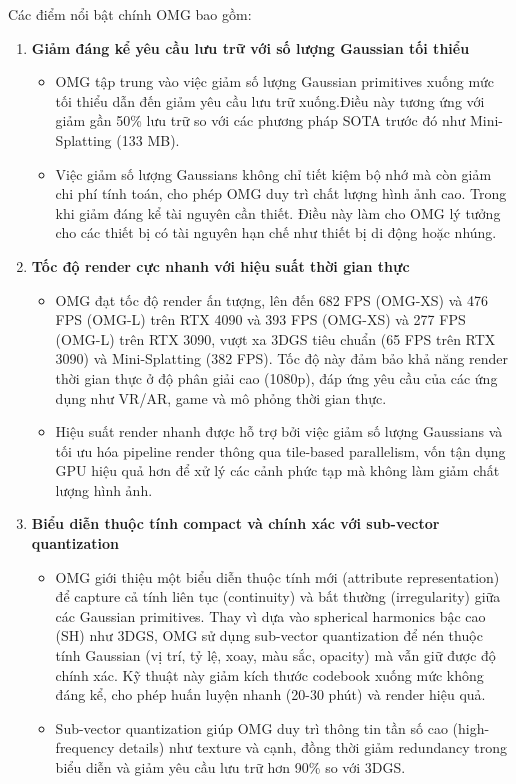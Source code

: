 Các điểm nổi bật chính OMG bao gồm:
\begin{enumerate}
    \item \textbf{Giảm đáng kể yêu cầu lưu trữ với số lượng Gaussian tối thiểu}
    \begin{itemize}
        \item OMG tập trung vào việc giảm số lượng Gaussian primitives xuống mức tối thiểu dẫn đến giảm yêu cầu lưu trữ xuống.Điều này tương ứng với giảm gần 50\% lưu trữ so với các phương pháp SOTA trước đó như Mini-Splatting (133 MB).
        \item Việc giảm số lượng Gaussians không chỉ tiết kiệm bộ nhớ mà còn giảm chi phí tính toán, cho phép OMG duy trì chất lượng hình ảnh cao. Trong khi giảm đáng kể tài nguyên cần thiết. Điều này làm cho OMG lý tưởng cho các thiết bị có tài nguyên hạn chế như thiết bị di động hoặc nhúng.
    \end{itemize}
    \item \textbf{Tốc độ render cực nhanh với hiệu suất thời gian thực}
    \begin{itemize}
        \item OMG đạt tốc độ render ấn tượng, lên đến 682 FPS (OMG-XS) và 476 FPS (OMG-L) trên RTX 4090 và 393 FPS (OMG-XS) và 277 FPS (OMG-L) trên RTX 3090, vượt xa 3DGS tiêu chuẩn (65 FPS trên RTX 3090) và Mini-Splatting (382 FPS). Tốc độ này đảm bảo khả năng render thời gian thực ở độ phân giải cao (1080p), đáp ứng yêu cầu của các ứng dụng như VR/AR, game và mô phỏng thời gian thực.
        \item Hiệu suất render nhanh được hỗ trợ bởi việc giảm số lượng Gaussians và tối ưu hóa pipeline render thông qua tile-based parallelism, vốn tận dụng GPU hiệu quả hơn để xử lý các cảnh phức tạp mà không làm giảm chất lượng hình ảnh.
    \end{itemize}
    \item \textbf{Biểu diễn thuộc tính compact và chính xác với sub-vector quantization}
    \begin{itemize}
        \item OMG giới thiệu một biểu diễn thuộc tính mới (attribute representation) để capture cả tính liên tục (continuity) và bất thường (irregularity) giữa các Gaussian primitives. Thay vì dựa vào spherical harmonics bậc cao (SH) như 3DGS, OMG sử dụng sub-vector quantization để nén thuộc tính Gaussian (vị trí, tỷ lệ, xoay, màu sắc, opacity) mà vẫn giữ được độ chính xác. Kỹ thuật này giảm kích thước codebook xuống mức không đáng kể, cho phép huấn luyện nhanh (20-30 phút) và render hiệu quả.
        \item Sub-vector quantization giúp OMG duy trì thông tin tần số cao (high-frequency details) như texture và cạnh, đồng thời giảm redundancy trong biểu diễn và giảm yêu cầu lưu trữ hơn 90\% so với 3DGS.
    \end{itemize}
\end{enumerate}
